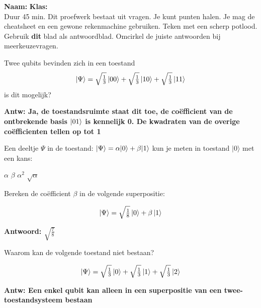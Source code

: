 \documentclass[a4paper, addpoints, 12pt
    , answers    %
    ]{exam}
\newcommand{\timelimit}{45 min.}
\begin{document}
\hfill\textbf{Naam:}\enspace\makebox[2in]{\hrulefill} \textbf{Klas:}\enspace\makebox[1in]{\hrulefill} \\

Duur \timelimit
Dit proefwerk bestaat uit \numquestions{} vragen. Je kunt \numpoints{} punten halen. %
Je mag de cheatsheet en een gewone rekenmachine gebruiken. Teken met een scherp potlood. Gebruik \textbf{dit} blad als antwoordblad. Omcirkel de juiste antwoorden bij meerkeuzevragen.

\begin{questions}
\pointsinmargin  %

\question[1]
Twee qubits bevinden zich in een toestand
\[\ket{\Psi} = \sqrt{\tfrac{1}{3}}\ket{00}+ \sqrt{\tfrac{1}{3}}\ket{10}+\sqrt{\tfrac{1}{3}}\ket{11}\]
is dit mogelijk?

\ifprintanswers
\textbf{Antw: Ja, de toestandsruimte staat dit toe, de co\"efficient van de ontbrekende basis $\ket{01}$ is kennelijk 0. De kwadraten van de overige co\"efficienten tellen op tot 1
}
\else
\fillwithlines{.5in}
\fi


\question[1]
Een deeltje $\Psi$ in de toestand: $\ket{\Psi}=\alpha |0 \rangle + \beta |1 \rangle$
kun je meten in toestand $| 0 \rangle$ met een kans:

\begin{choices}
\choice $\alpha$
\choice $\beta$
\correctchoice $\alpha^2$
\choice $\sqrt{\alpha}$
\end{choices}

\question[1]
Bereken de co\"efficient $\beta$ in de volgende superpositie:

\[\ket{\Psi} = \sqrt{\tfrac{1}{8}}\ket{0}+ \beta\ket{1}\]

\ifprintanswers
\textbf{Antwoord: $\sqrt{\tfrac{7}{8}}$
}
\else
\fillwithlines{.5in}
\fi

\question[1]
Waarom kan de volgende toestand niet bestaan?

\[\ket{\Psi} = \sqrt{\tfrac{1}{3}}\ket{0}+ \sqrt{\tfrac{1}{3}}\ket{1}+\sqrt{\tfrac{1}{3}}\ket{2}\]

\ifprintanswers
\textbf{Antw: Een enkel qubit kan alleen in een superpositie van een twee-toestandsysteem bestaan
}
\else
\fillwithlines{.5in}
\fi


\end{questions}
\end{document}
